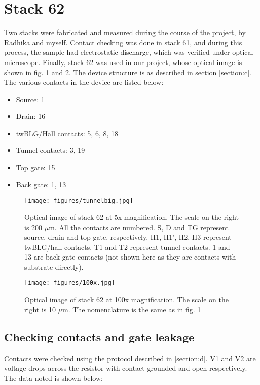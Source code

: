 \section{Stack 62}
Two stacks were fabricated and measured during the course of the project, by Radhika and myself. Contact checking was done in stack 61, and during this process, the sample had electrostatic discharge, which was verified under optical microscope. Finally, stack 62 was used in our project, whose optical image is shown in fig. \ref{fig:tunnelbig} and \ref{fig:tunnel}. The device structure is as described in section \ref{section:c}. The various contacts in the device are listed below:
\begin{itemize}
	\item Source: 1
	\item Drain: 16
	\item twBLG/Hall contacts: 5, 6, 8, 18
	\item Tunnel contacts: 3, 19
	\item Top gate: 15
	\item Back gate: 1, 13
\end{itemize}

\begin{figure}[H]
	\centering
	\texttt{[image: figures/tunnelbig.jpg]}
	\caption{Optical image of stack 62 at 5x magnification. The scale on the right is 200 $\mu$m. All the contacts are numbered. S, D and TG represent source, drain and top gate, respectively. H1, H1', H2, H3 represent twBLG/hall contacts. T1 and T2 represent tunnel contacts. 1 and 13 are back gate contacts (not shown here as they are contacts with substrate directly).}
	\label{fig:tunnelbig}
\end{figure}

\begin{figure}[H]
	\centering
	\texttt{[image: figures/100x.jpg]}
	\caption{Optical image of stack 62 at 100x magnification. The scale on the right is 10 $\mu$m. The nomenclature is the same as in fig. \ref{fig:tunnelbig}}
	\label{fig:tunnel}
\end{figure}

\subsection{Checking contacts and gate leakage}

Contacts were checked using the protocol described in \ref{section:d}. V1 and V2 are voltage drops across the resistor with contact grounded and open respectively. The data noted is shown below:

